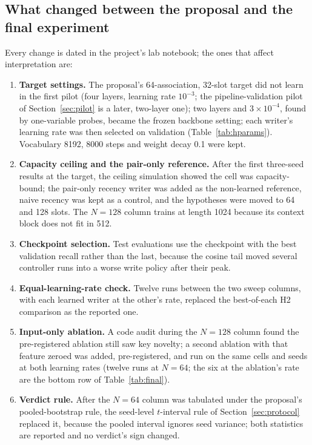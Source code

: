 \documentclass[conference]{IEEEtran}
\begin{document}
\subsection{What changed between the proposal and the final experiment}
\label{sec:changes}

Every change is dated in the project's lab notebook; the ones that affect
interpretation are:
\begin{enumerate}
\item \textbf{Target settings.} The proposal's 64-association, 32-slot target
did not learn in the first pilot (four layers, learning rate $10^{-3}$; the
pipeline-validation pilot of Section~\ref{sec:pilot} is a later, two-layer
one); two
layers and $3 \times 10^{-4}$, found by one-variable probes, became the frozen
backbone setting; each writer's learning rate was then selected on validation
(Table~\ref{tab:hparams}). Vocabulary 8192, 8000 steps and weight decay 0.1 were
kept.
\item \textbf{Capacity ceiling and the pair-only reference.} After the first
three-seed results at the target, the ceiling simulation showed the cell was
capacity-bound; the pair-only recency writer was added as the non-learned
reference, naive recency was kept as a control, and the hypotheses were moved
to 64 and 128 slots. The $N = 128$ column trains at length 1024 because its
context block does not fit in 512.
\item \textbf{Checkpoint selection.} Test evaluations use the checkpoint with
the best validation recall rather than the last, because the cosine tail moved
several controller runs into a worse write policy after their peak.
\item \textbf{Equal-learning-rate check.} Twelve runs between the two sweep
columns, with
each learned writer at the other's rate, replaced the best-of-each H2
comparison as the reported one.
\item \textbf{Input-only ablation.} A code audit during the $N = 128$ column
found the pre-registered ablation still saw key novelty; a second ablation
with that feature zeroed was added, pre-registered, and run on the same cells
and seeds at both learning rates (twelve runs at $N = 64$; the six at the
ablation's rate are the bottom row of Table~\ref{tab:final}).
\item \textbf{Verdict rule.} After the $N = 64$ column was tabulated under the
proposal's pooled-bootstrap rule, the seed-level $t$-interval rule of
Section~\ref{sec:protocol} replaced it, because the pooled interval ignores
seed variance; both statistics are reported and no verdict's sign changed.

\end{enumerate}
\end{document}

